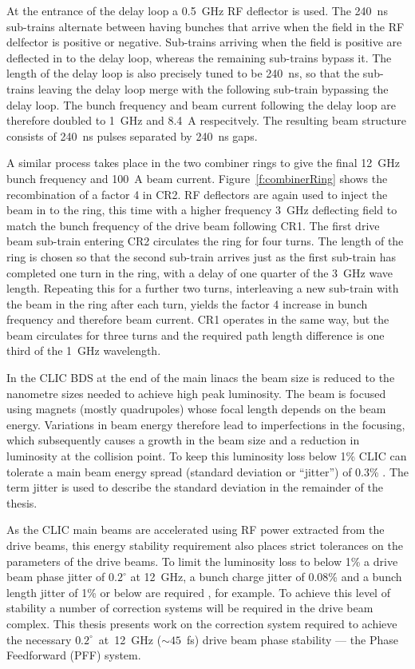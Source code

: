 At the entrance of the delay loop a 0.5~GHz RF deflector is used. The 240~ns sub-trains alternate between having bunches that arrive when the field in the RF delfector is positive or negative. Sub-trains arriving when the field is positive are deflected in to the delay loop, whereas the remaining sub-trains bypass it. The length of the delay loop is also precisely tuned to be 240~ns, so that the sub-trains leaving the delay loop merge with the following sub-train bypassing the delay loop. The bunch frequency and beam current following the delay loop are therefore doubled to 1~GHz and 8.4~A respecitvely. The resulting beam structure consists of 240~ns pulses separated by 240~ns gaps.

A similar process takes place in the two combiner rings to give the final 12~GHz bunch frequency and 100~A beam current. Figure~\ref{f:combinerRing} shows the recombination of a factor 4 in CR2. RF deflectors are again used to inject the beam in to the ring, this time with a higher frequency 3~GHz deflecting field to match the bunch frequency of the drive beam following CR1. The first drive beam sub-train entering CR2 circulates the ring for four turns. The length of the ring is chosen so that the second sub-train arrives just as the first sub-train has completed one turn in the ring, with a delay of one quarter of the 3~GHz wave length. Repeating this for a further two turns, interleaving a new sub-train with the beam in the ring after each turn, yields the factor 4 increase in bunch frequency and therefore beam current. CR1 operates in the same way, but the beam circulates for three turns and the required path length difference is one third of the 1~GHz wavelength.


In the CLIC BDS at the end of the main linacs the beam size is reduced to the nanometre sizes needed to achieve high peak luminosity. The beam is focused using magnets (mostly quadrupoles) whose focal length depends on the beam energy. Variations in beam energy therefore lead to imperfections in the focusing, which subsequently causes a growth in the beam size and a reduction in luminosity at the collision point. To keep this luminosity loss below 1\% CLIC can tolerate a main beam energy spread (standard deviation or ``jitter'') of 0.3\% \cite{clicCDR}. The term jitter is used to describe the standard deviation in the remainder of the thesis. 

As the CLIC main beams are accelerated using RF power extracted from the drive beams, this energy stability requirement also places strict tolerances on the parameters of the drive beams. To limit the luminosity loss to below 1\% a drive beam phase jitter of \(0.2^\circ\) at 12~GHz, a bunch charge jitter of 0.08\% and a bunch length jitter of 1\% or below are required \cite{clicStabReq}, for example. To achieve this level of stability a number of correction systems will be required in the drive beam complex. This thesis presents work on the correction system required to achieve the necessary \(0.2^\circ\)~at~12~GHz (\(\sim45\)~fs) drive beam phase stability --- the Phase Feedforward (PFF) system.

